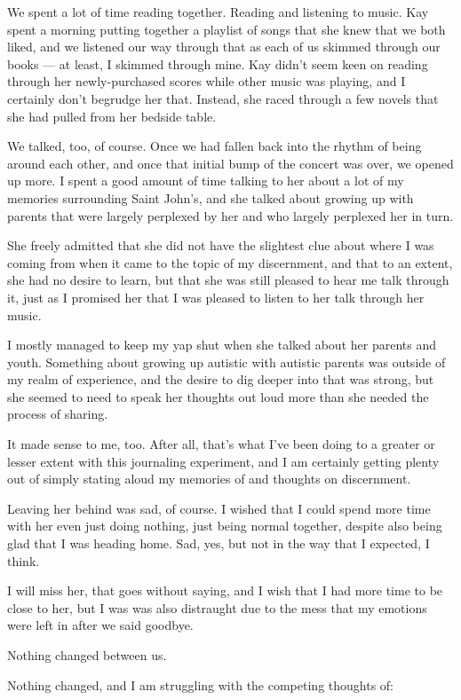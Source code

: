 We spent a lot of time reading together. Reading and listening to music. Kay spent a morning putting together a playlist of songs that she knew that we both liked, and we listened our way through that as each of us skimmed through our books --- at least, I skimmed through mine. Kay didn't seem keen on reading through her newly-purchased scores while other music was playing, and I certainly don't begrudge her that. Instead, she raced through a few novels that she had pulled from her bedside table.

We talked, too, of course. Once we had fallen back into the rhythm of being around each other, and once that initial bump of the concert was over, we opened up more. I spent a good amount of time talking to her about a lot of my memories surrounding Saint John's, and she talked about growing up with parents that were largely perplexed by her and who largely perplexed her in turn.

She freely admitted that she did not have the slightest clue about where I was coming from when it came to the topic of my discernment, and that to an extent, she had no desire to learn, but that she was still pleased to hear me talk through it, just as I promised her that I was pleased to listen to her talk through her music.

I mostly managed to keep my yap shut when she talked about her parents and youth. Something about growing up autistic with autistic parents was outside of my realm of experience, and the desire to dig deeper into that was strong, but she seemed to need to speak her thoughts out loud more than she needed the process of sharing.

It made sense to me, too. After all, that's what I've been doing to a greater or lesser extent with this journaling experiment, and I am certainly getting plenty out of simply stating aloud my memories of and thoughts on discernment.

Leaving her behind was sad, of course. I wished that I could spend more time with her even just doing nothing, just being normal together, despite also being glad that I was heading home. Sad, yes, but not in the way that I expected, I think.

I will miss her, that goes without saying, and I wish that I had more time to be close to her, but I was was also distraught due to the mess that my emotions were left in after we said goodbye.

Nothing changed between us.

Nothing changed, and I am struggling with the competing thoughts of:

